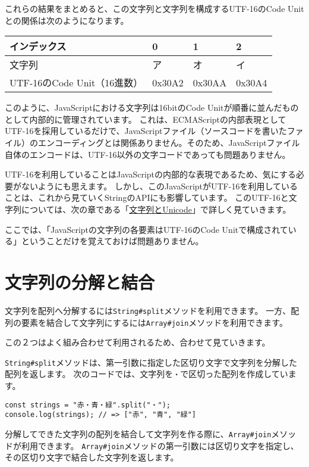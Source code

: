 これらの結果をまとめると、この文字列と文字列を構成するUTF-16のCode
Unitとの関係は次のようになります。

\begin{longtable}[]{@{}llll@{}}
\toprule
インデックス & 0 & 1 & 2\tabularnewline
\midrule
\endhead
文字列 & ア & オ & イ\tabularnewline
UTF-16のCode Unit（16進数） & 0x30A2 & 0x30AA & 0x30A4\tabularnewline
\bottomrule
\end{longtable}

このように、JavaScriptにおける文字列は16bitのCode
Unitが順番に並んだものとして内部的に管理されています。
これは、ECMAScriptの内部表現としてUTF-16を採用しているだけで、JavaScriptファイル（ソースコードを書いたファイル）のエンコーディングとは関係ありません。そのため、JavaScriptファイル自体のエンコードは、UTF-16以外の文字コードであっても問題ありません。

UTF-16を利用していることはJavaScriptの内部的な表現であるため、気にする必要がないようにも思えます。
しかし、このJavaScriptがUTF-16を利用していることは、これから見ていくStringのAPIにも影響しています。
このUTF-16と文字列については、次の章である「\href{../string-unicode/README.md}{文字列とUnicode}」で詳しく見ていきます。

ここでは、「JavaScriptの文字列の各要素はUTF-16のCode
Unitで構成されている」ということだけを覚えておけば問題ありません。

\hypertarget{split-join}{%
\section{文字列の分解と結合}\label{split-join}}

文字列を配列へ分解するには\texttt{String\#split}メソッドを利用できます。
一方、配列の要素を結合して文字列にするには\texttt{Array\#join}メソッドを利用できます。

この２つはよく組み合わせて利用されるため、合わせて見ていきます。

\texttt{String\#split}メソッドは、第一引数に指定した区切り文字で文字列を分解した配列を返します。
次のコードでは、文字列を\texttt{・}で区切った配列を作成しています。

\begin{lstlisting}
const strings = "赤・青・緑".split("・");
console.log(strings); // => ["赤", "青", "緑"]
\end{lstlisting}

分解してできた文字列の配列を結合して文字列を作る際に、\texttt{Array\#join}メソッドが利用できます。
\texttt{Array\#join}メソッドの第一引数には区切り文字を指定し、その区切り文字で結合した文字列を返します。

